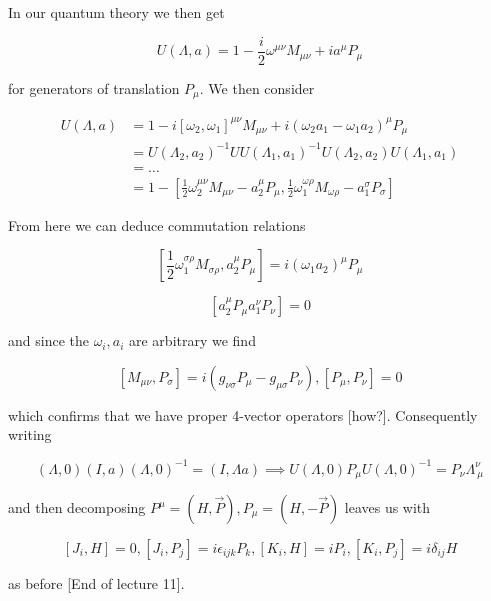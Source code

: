 \documentclass{article}
\theoremstyle{definition}
\begin{document}
In our quantum theory we then get

$$ U(\Lambda, a) = 1 - \frac{i}{2} \omega^{\mu \nu} M_{\mu \nu} + i a^\mu
P_\mu $$

for generators of translation $P_\mu$. We then consider

\begin{align*}
  U(\Lambda, a) &= 1 - i[\omega_2, \omega_1]^{\mu \nu} M_{\mu \nu} + i (\omega_2 a_1 - \omega_1 a_2)^\mu P_\mu \\
                &= U(\Lambda_2, a_2)^{-1} UU(\Lambda_1, a_1)^{-1} U(\Lambda_2, a_2) U(\Lambda_1, a_1) \\
                &= \dots \\
                &= 1 - [\frac{1}{2} \omega_2^{\mu \nu} M_{\mu \nu} - a_2^\mu P_\mu, \frac{1}{2} \omega_1^{\omega \rho} M_{\omega \rho} - a_1^\sigma P_\sigma]
\end{align*}

From here we can deduce commutation relations

$$ [\frac{1}{2} \omega_1^{\sigma \rho} M_{\sigma \rho}, a_2^\mu P_\mu] = i
(\omega_1 a_2)^{\mu} P_\mu $$

$$ [a_2^\mu P_\mu a_1^\nu P_\nu] = 0 $$

and since the $\omega_i, a_i$ are arbitrary we find

$$ [M_{\mu \nu}, P_\sigma] = i (g_{\nu \sigma} P_\mu - g_{\mu \sigma} P_\nu),
[P_\mu, P_\nu] = 0 $$

which confirms that we have proper 4-vector operators [how?]. Consequently
writing

$$ (\Lambda, 0) (I, a) (\Lambda, 0)^{-1} = (I, \Lambda a) \implies U(\Lambda, 0)
P_\mu U(\Lambda, 0)^{-1} = P_\nu \Lambda^\nu_{\ \mu} $$

and then decomposing $P^\mu = (H, \vec{P}), P_\mu = (H, -\vec{P})$ leaves us
with

$$ [J_i, H] = 0, [J_i, P_j] = i \epsilon_{ijk} P_k, [K_i, H] = iP_i, [K_i, P_j]
= i \delta_{ij} H $$

as before [End of lecture 11]. 
                  
\end{document}
